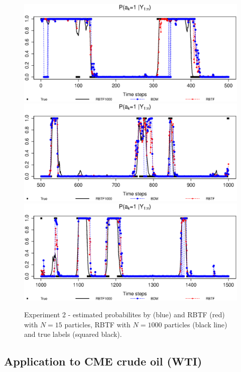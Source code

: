 \begin{figure}
\centering
\includegraphics[scale=.5]{N15_1_500.eps}
\includegraphics[scale=.5]{N15_501_1000.eps}
\includegraphics[scale=.5]{N15_1001_1500.eps}
\caption{Experiment 2 - estimated probabilites by \cite{briers:doucet:maskell:2010} (blue) and RBTF (red) with $N=15$ particles, RBTF with $N=1000$ particles (black line) and true labels (squared black).}
\label{fig:exp2:label}
\end{figure}

\subsection{Application to CME crude oil (WTI)}
\label{sec:exp}


